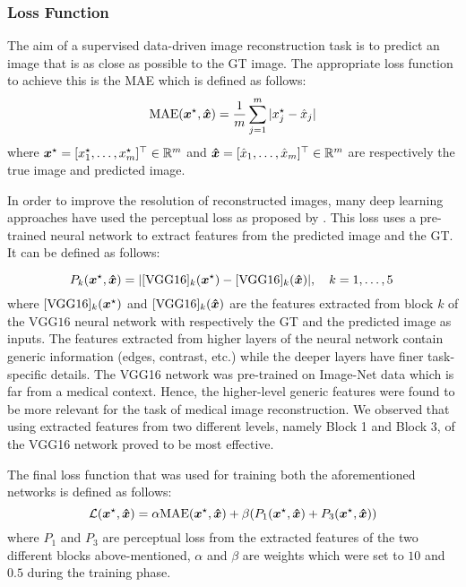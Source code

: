 \subsubsection{Loss Function}
The aim of a supervised data-driven image reconstruction task is to predict an image that is as close as possible to the \ac{GT} image. The appropriate loss function to achieve this is the \ac{MAE} which is defined as follows:
\begin{equation}
\mathrm{MAE}(\bm{x}^\star, \bm{\hat{x}}) = \frac{1}{m}   \sum_{j=1}^m |x^\star_j - \hat{x}_j|
\end{equation}
where $\bm{x}^\star =  [x_1^\star, \dots , x_m^\star]^\top \in \mathbb{R}^m$ and $\bm{\hat{x}}= [\hat{x}_1, \dots , \hat{x}_m]^\top \in \mathbb{R}^m$ are respectively the true image and predicted image.

In order to improve the resolution of reconstructed images, many deep learning approaches have used the perceptual loss as proposed by \cite{johnson2016perceptual}. This loss uses a pre-trained neural network to extract features from the predicted image and the \ac{GT}. It can be defined as follows:

\begin{equation}
P_k(\bm{x}^\star,\bm{\hat{x}}) =  |[\mathrm{VGG16}]_k(\bm{x}^\star) - [\mathrm{VGG16}]_k( \bm{\hat{x}})|, \quad k =1,\dots,5 \,  
\end{equation}
where $[\mathrm{VGG16}]_k(\bm{x}^\star)$ and $[\mathrm{VGG16}]_k( \bm{\hat{x}})$ are the features extracted from block $k$ of the $\mathrm{VGG16}$ neural network \cite{simonyan2014very} with respectively the \ac{GT} and the predicted image as inputs. The features extracted from higher layers of the neural network contain generic information (edges, contrast, etc.) while the deeper layers have finer task-specific details. The VGG16 network was pre-trained on Image-Net data \cite{deng2009imagenet} which is far from a medical context. Hence, the higher-level generic features were found to be more relevant for the task of medical image reconstruction. We observed that using extracted features from two different levels, namely Block 1 and Block 3, of the VGG16 network proved to be most effective. 

The final loss function that was used for training both the aforementioned networks is defined as follows: 
\begin{equation}\label{eq:loss}
\mathcal{L}(\bm{x}^\star,\bm{\hat{x}}) = \alpha\mathrm{MAE}(\bm{x}^\star, \bm{\hat{x}})+\beta(P_{1}(\bm{x}^\star,\bm{\hat{x}})+P_{3}(\bm{x}^\star,\bm{\hat{x}}))
\end{equation}
where $P_{1}$ and $P_{3}$ are perceptual loss from the extracted features of the two different blocks above-mentioned, $\alpha$ and $\beta$ are weights which were set to $10$ and $0.5$ during the training phase.  


